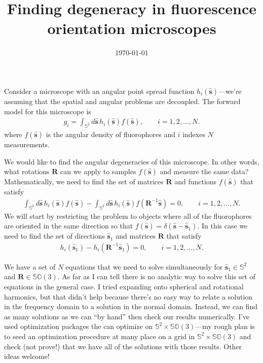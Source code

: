 \documentclass[11pt]{article}
\providecommand{\mb}[1]{\mathbf{#1}}
\providecommand{\so}[1]{\mathbf{\hat{s}}_1}
\providecommand{\s}[1]{\mathbf{\hat{s}}}
\begin{document}
\title{\vspace{-2.5em} Finding degeneracy in fluorescence orientation microscopes \vspace{-1em}}  \vspace{-2em} \author{}
\date{\vspace{-3em}\today\vspace{-2em}}
\maketitle

Consider a microscope with an angular point spread function $h_i(\s{})$---we're
assuming that the spatial and angular problems are decoupled. The forward model for
this microscope is
\begin{align}
  g_i = \int_{\mathbb{S}^2}d\s{}\, h_i(\s{})f(\s{}), \qquad i=1, 2, ..., N.
\end{align}
where $f(\s{})$ is the angular density of fluorophores and $i$ indexes $N$
measurements.

We would like to find the angular degeneracies of this microscope. In other
words, what rotations $\mb{R}$ can we apply to samples $f(\s{})$ and measure
the same data? Mathematically, we need to find the set of matrices $\mb{R}$ and
functions $f(\s{})$ that satisfy
\begin{align}
  \int_{\mathbb{S}^2}d\s{}\, h_i(\s{})f(\s{}) - \int_{\mathbb{S}^2}d\s{}\, h_i(\s{})f(\mb{R}^{-1}\s{}) = 0, \qquad i=1, 2, ..., N. \label{eq:tosolve}
\end{align}
We will start by restricting the problem to objects where all of the
fluorophores are oriented in the same direction so that
$f(\s{}) = \delta(\s{} - \so{})$. In this case we need to find the set of
directions $\so{}$ and matrices $\mb{R}$ that satisfy
\begin{align}
  h_i(\so{}) - h_i(\mb{R}^{-1}\so{}) = 0, \qquad i=1, 2, ..., N. \label{eq:tosolve2}
\end{align}

We have a set of $N$ equations that we need to solve simultaneously for
$\so{} \in \mathbb{S}^2$ and $\mb{R} \in \mathbb{SO}(3)$. As far as I can tell
there is no analytic way to solve this set of equations in the general case. I
tried expanding onto spherical and rotational harmonics, but that didn't help
because there's no easy way to relate a solution in the frequency domain to a
solution in the normal domain. Instead, we can find as many solutions as we can
``by hand'' then check our results numerically. I've used optimization packages
the can optimize on $\mathbb{S}^2\times \mathbb{SO}(3)$---my rough plan is to
seed an optimization procedure at many place on a grid in
$\mathbb{S}^2\times \mathbb{SO}(3)$ and check (not prove!) that we have all of
the solutions with those results. Other ideas welcome!
\end{document}
